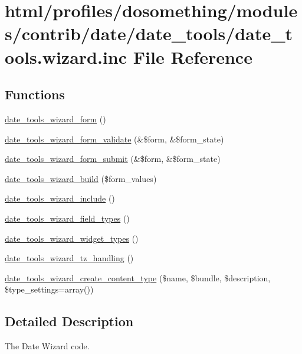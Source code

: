 \hypertarget{date__tools_8wizard_8inc}{
\section{html/profiles/dosomething/modules/contrib/date/date\_\-tools/date\_\-tools.wizard.inc File Reference}
\label{date__tools_8wizard_8inc}
}
\subsection*{Functions}
\begin{DoxyCompactItemize}
\item 
\hyperlink{date__tools_8wizard_8inc_ac60f909f2de9f41bbe10fec1c67fa961}{date\_\-tools\_\-wizard\_\-form} ()
\item 
\hyperlink{date__tools_8wizard_8inc_abfe7527e089677e06b19dc331d5f1069}{date\_\-tools\_\-wizard\_\-form\_\-validate} (\&\$form, \&\$form\_\-state)
\item 
\hyperlink{date__tools_8wizard_8inc_aa03335f62e6ddc5a937305158e624e14}{date\_\-tools\_\-wizard\_\-form\_\-submit} (\&\$form, \&\$form\_\-state)
\item 
\hyperlink{date__tools_8wizard_8inc_ab7d7bbdde95f900b9b2a2eaaba98ec3f}{date\_\-tools\_\-wizard\_\-build} (\$form\_\-values)
\item 
\hyperlink{date__tools_8wizard_8inc_abbc536f1be44a6f130797f4961c5b5a0}{date\_\-tools\_\-wizard\_\-include} ()
\item 
\hyperlink{date__tools_8wizard_8inc_a7cb54be4dc0691f3869fb0d944c0a01a}{date\_\-tools\_\-wizard\_\-field\_\-types} ()
\item 
\hyperlink{date__tools_8wizard_8inc_acfa16fe3944bb267117e0163a125679b}{date\_\-tools\_\-wizard\_\-widget\_\-types} ()
\item 
\hyperlink{date__tools_8wizard_8inc_a9e67a9593d1b2c9aeb64c1709961e4f7}{date\_\-tools\_\-wizard\_\-tz\_\-handling} ()
\item 
\hyperlink{date__tools_8wizard_8inc_ae162fcc781ba0aa2c1790ad4fa41cd4a}{date\_\-tools\_\-wizard\_\-create\_\-content\_\-type} (\$name, \$bundle, \$description, \$type\_\-settings=array())
\end{DoxyCompactItemize}


\subsection{Detailed Description}
The Date Wizard code. 

